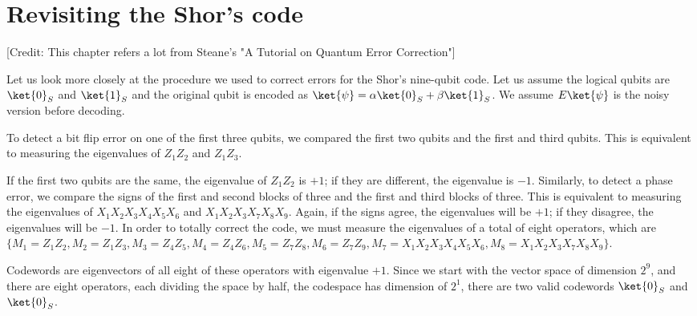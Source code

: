 \Contributor{}

\lstset{style=mystyle}


	\MakeScribeTop

\section{Revisiting the Shor's code}
[Credit: This chapter refers a lot from Steane's "A Tutorial on Quantum Error Correction"]

Let us look more closely at the procedure we used to correct errors for the Shor's nine-qubit code. Let us assume the logical qubits are \(\ket{0}_S\) and \(\ket{1}_S\) and the original qubit is encoded as \(\ket{\psi} = \alpha \ket{0}_S + \beta \ket{1}_S\). We assume \(E\ket{\psi}\) is the noisy version before decoding. 

To detect a bit flip error on one of the first three qubits, we compared the first two qubits and the first and third qubits. This is equivalent to measuring the eigenvalues of \(Z_1Z_2\) and \(Z_1Z_3\).

If the first two qubits are the same, the eigenvalue of \(Z_1Z_2\) is \(+1\); if they are different, the eigenvalue is \(-1\). Similarly, to detect a phase error, we compare the signs of the first and second blocks of three and the first and third blocks of three. This is equivalent to measuring the eigenvalues of \(X_1X_2X_3X_4X_5X_6\) and \(X_1X_2X_3X_7X_8X_9\). Again, if the signs agree, the eigenvalues will be \(+1\); if they disagree, the eigenvalues will be \(-1\). In order to totally correct the code, we must measure the eigenvalues of a total of eight operators, which are \(\{M_1 = Z_1Z_2, M_2 = Z_1Z_3, M_3 = Z_4Z_5, M_4 = Z_4Z_6, M_5 = Z_7Z_8, M_6 = Z_7Z_9, M_7 = X_1X_2X_3X_4X_5X_6, M_8 = X_1X_2X_3X_7X_8X_9\}\). 

Codewords are  eigenvectors of all eight of these operators with eigenvalue \(+1\). Since we start with the vector space of dimension \(2^9\), and there are eight operators, each dividing the space by half, the codespace has dimension of \(2^1\), there are two valid codewords \(\ket{0}_S\) and \(\ket{0}_S\). 

